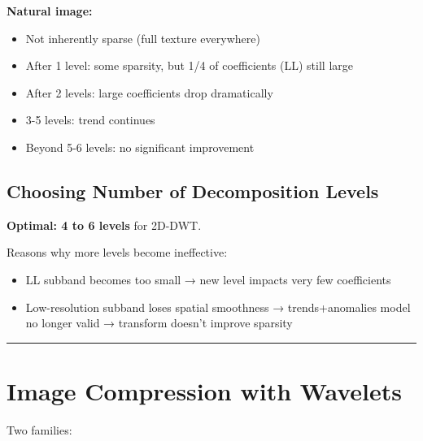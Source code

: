 \textbf{Natural image:}
\begin{itemize}
\item Not inherently sparse (full texture everywhere)
\item After 1 level: some sparsity, but 1/4 of coefficients (LL) still large
\item After 2 levels: large coefficients drop dramatically
\item 3-5 levels: trend continues
\item Beyond 5-6 levels: no significant improvement
\end{itemize}

\begin{center}\end{center}

\subsection{Choosing Number of Decomposition Levels}

\textbf{Optimal: 4 to 6 levels} for 2D-DWT.

Reasons why more levels become ineffective:
\begin{itemize}
\item LL subband becomes too small → new level impacts very few coefficients
\item Low-resolution subband loses spatial smoothness → trends+anomalies model no longer valid → transform doesn't improve sparsity
\end{itemize}

\begin{center}\end{center}

\bigskip\hrule\bigskip

\section{Image Compression with Wavelets}

Two families:


